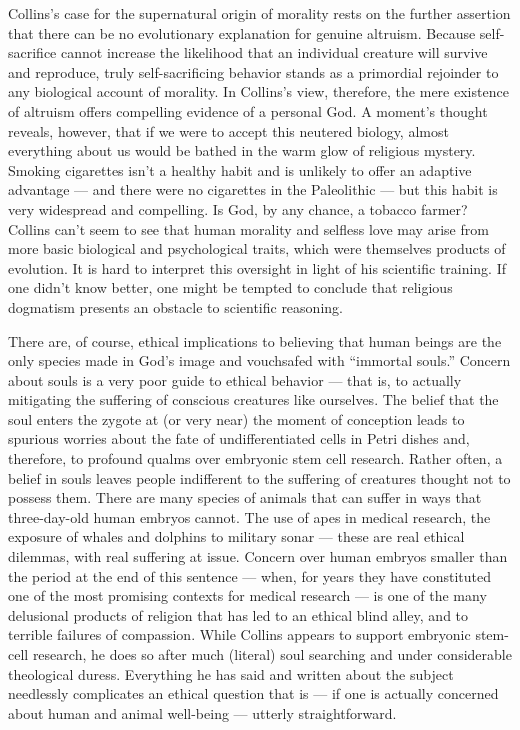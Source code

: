 \documentclass[a4paper,14pt]{extarticle}
\begin{document}
Collins’s case for the supernatural origin of morality rests on the further assertion that there can be no evolutionary explanation for genuine altruism.
Because self-sacrifice cannot increase the likelihood that an individual creature will survive and reproduce, truly self-sacrificing behavior stands as a primordial rejoinder to any biological account of morality.
In Collins’s view, therefore, the mere existence of altruism offers compelling evidence of a personal God.
A moment’s thought reveals, however, that if we were to accept this neutered biology, almost everything about us would be bathed in the warm glow of religious mystery.
Smoking cigarettes isn’t a healthy habit and is unlikely to offer an adaptive advantage --- and there were no cigarettes in the Paleolithic --- but this habit is very widespread and compelling.
Is God, by any chance, a tobacco farmer?
Collins can’t seem to see that human morality and selfless love may arise from more basic biological and psychological traits, which were themselves products of evolution.
It is hard to interpret this oversight in light of his scientific training.
If one didn’t know better, one might be tempted to conclude that religious dogmatism presents an obstacle to scientific reasoning.

There are, of course, ethical implications to believing that human beings are the only species made in God’s image and vouchsafed with ``immortal souls.''
Concern about souls is a very poor guide to ethical behavior --- that is, to actually mitigating the suffering of conscious creatures like ourselves.
The belief that the soul enters the zygote at (or very near) the moment of conception leads to spurious worries about the fate of undifferentiated cells in Petri dishes and, therefore, to profound qualms over embryonic stem cell research.
Rather often, a belief in souls leaves people indifferent to the suffering of creatures thought not to possess them.
There are many species of animals that can suffer in ways that three-day-old human embryos cannot.
The use of apes in medical research, the exposure of whales and dolphins to military sonar --- these are real ethical dilemmas, with real suffering at issue.
Concern over human embryos smaller than the period at the end of this sentence --- when, for years they have constituted one of the most promising contexts for medical research --- is one of the many delusional products of religion that has led to an ethical blind alley, and to terrible failures of compassion.
While Collins appears to support embryonic stem-cell research, he does so after much (literal) soul searching and under considerable theological duress.
Everything he has said and written about the subject needlessly complicates an ethical question that is --- if one is actually concerned about human and animal well-being --- utterly straightforward.
\end{document}
